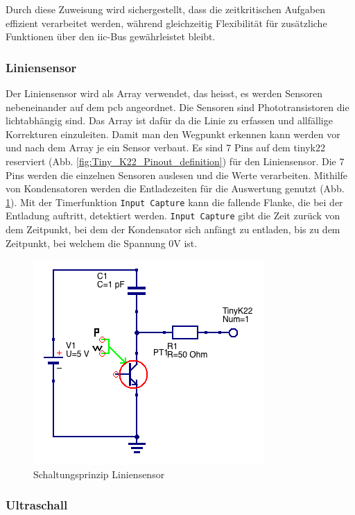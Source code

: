 Durch diese Zuweisung wird sichergestellt, dass die zeitkritischen Aufgaben effizient verarbeitet werden, während gleichzeitig Flexibilität für zusätzliche Funktionen über den \acrshort{iic}-Bus gewährleistet bleibt.


\subsubsection*{Liniensensor}


Der Liniensensor wird als Array verwendet, das heisst, es werden Sensoren nebeneinander auf dem \acrshort{pcb} angeordnet. Die Sensoren sind Phototransistoren die lichtabhängig sind. Das Array ist dafür da die Linie zu erfassen und allfällige Korrekturen einzuleiten. Damit man den Wegpunkt erkennen kann werden vor und nach dem Array je ein Sensor verbaut. Es sind 7 Pins auf dem \gls{tinyk22} reserviert (Abb. \ref{fig:Tiny_K22_Pinout_definition}) für den Liniensensor. Die 7 Pins werden die einzelnen Sensoren auslesen und die Werte verarbeiten. Mithilfe von Kondensatoren werden die Entladezeiten für die Auswertung genutzt (Abb. \ref{fig:Liniensensor_Schaltung}). Mit der Timerfunktion \verb|Input Capture| kann die fallende Flanke, die bei der Entladung auftritt, detektiert werden. \verb|Input Capture| gibt die Zeit zurück von dem Zeitpunkt, bei dem der Kondensator sich anfängt zu entladen, bis zu dem Zeitpunkt, bei welchem die Spannung 0V ist.

\begin{figure}[H]
    \centering
    \includegraphics[width=0.4\linewidth]{img/Liniensensor_Schaltung.png}
    \caption{Schaltungsprinzip Liniensensor}
    \label{fig:Liniensensor_Schaltung}
\end{figure}

\subsubsection*{Ultraschall}

